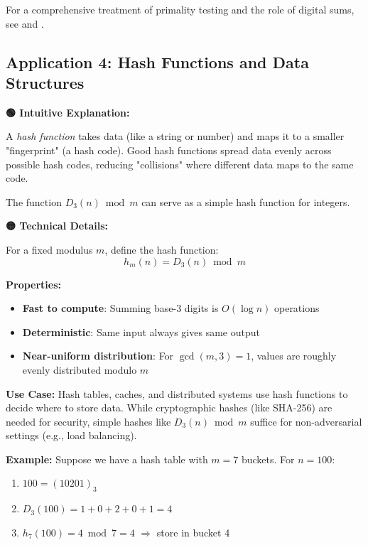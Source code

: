 For a comprehensive treatment of primality testing and the role of digital sums, see \cite{crandall2005} and \cite{apostol1976}.

\subsection{Application 4: Hash Functions and Data Structures}

\textbf{🟢 Intuitive Explanation:}

A \textit{hash function} takes data (like a string or number) and maps it to a smaller "fingerprint" (a hash code). Good hash functions spread data evenly across possible hash codes, reducing "collisions" where different data maps to the same code.

The function $D_3(n) \bmod m$ can serve as a simple hash function for integers.

\textbf{🟡 Technical Details:}

\begin{definition}
\label{def:d3-hash}
For a fixed modulus $m$, define the hash function:
\begin{equation}
h_m(n) = D_3(n) \bmod m
\end{equation}
\end{definition}

\textbf{Properties:}
\begin{itemize}
\item \textbf{Fast to compute}: Summing base-3 digits is $O(\log n)$ operations
\item \textbf{Deterministic}: Same input always gives same output
\item \textbf{Near-uniform distribution}: For $\gcd(m, 3) = 1$, values are roughly evenly distributed modulo $m$
\end{itemize}

\textbf{Use Case:} Hash tables, caches, and distributed systems use hash functions to decide where to store data. While cryptographic hashes (like SHA-256) are needed for security, simple hashes like $D_3(n) \bmod m$ suffice for non-adversarial settings (e.g., load balancing).

\textbf{Example:} Suppose we have a hash table with $m = 7$ buckets. For $n = 100$:
\begin{enumerate}
\item $100 = (10201)_3$
\item $D_3(100) = 1 + 0 + 2 + 0 + 1 = 4$
\item $h_7(100) = 4 \bmod 7 = 4$ $\Rightarrow$ store in bucket 4
\end{enumerate}

